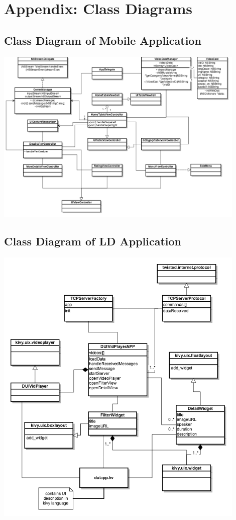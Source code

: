 \chapter{Appendix: Class Diagrams}\label{chapter:appendA}
\section{Class Diagram of Mobile Application}
\includegraphics[width=0.9\textwidth, inner, center]{class_diagramSD}
\newpage
\section{Class Diagram of LD Application}
\includegraphics[width=0.9\textwidth, inner, center]{class_diagramLD}
